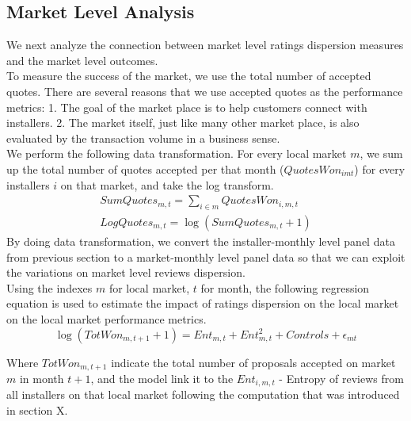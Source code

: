 \documentclass[msom,blindrev]{informs3}
\begin{document}
\subsection{Market Level Analysis}
We next analyze the connection between market level ratings dispersion measures and the market level outcomes. \\
 
To measure the success of the market, we use the total number of accepted quotes. There are several reasons that we use accepted quotes as the performance metrics: 1. The goal of the market place is to help customers connect with installers. 2. The market itself, just like many other market place, is also evaluated by the transaction volume in a business sense. \\
We perform the following data transformation. For every local market $m$, we sum up the total number of quotes accepted per that month ($QuotesWon_{imt}$) for every installers $i$ on that market, and take the log transform. 
\begin{align*}
SumQuotes_{m,t}=\sum_{i\in m} QuotesWon_{i,m,t}\\
LogQuotes_{m,t}=\log (SumQuotes_{m,t}+1)
\end{align*}
By doing data transformation, we convert the installer-monthly level panel data from previous section to a market-monthly level panel data so that we can exploit the variations on market level reviews dispersion.  \\
Using the indexes $m$ for local market, $t$ for month, the following regression equation is used to estimate the impact of ratings dispersion on the local market on the local market performance metrics. 
\begin{equation}
    \log(TotWon_{m,t+1}+1)=Ent_{m,t}+Ent_{m,t}^2+Controls+\epsilon_{mt}
\end{equation}

Where $TotWon_{m,t+1}$ indicate the total number of proposals accepted on market $m$ in month $t+1$, and the model link it to the $Ent_{i,m,t}$ - Entropy of reviews from all installers on that local market following the computation that was introduced in section X.   
\end{document}
